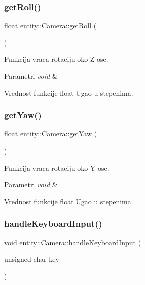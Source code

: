 \subsubsection{\texorpdfstring{get\+Roll()}{getRoll()}}
{\footnotesize\ttfamily float entity\+::\+Camera\+::get\+Roll (\begin{DoxyParamCaption}{ }\end{DoxyParamCaption})}



Funkcija vraca rotaciju oko Z ose. 


\begin{DoxyParams}{Parametri}
{\em void} & \\
\hline
\end{DoxyParams}
\begin{DoxyReturn}{Vrednost funkcije}
float Ugao u stepenima. 
\end{DoxyReturn}
\mbox{\label{classentity_1_1Camera_a598fc170be541c2daf281f3b3a267808}} 
\subsubsection{\texorpdfstring{get\+Yaw()}{getYaw()}}
{\footnotesize\ttfamily float entity\+::\+Camera\+::get\+Yaw (\begin{DoxyParamCaption}{ }\end{DoxyParamCaption})}



Funkcija vraca rotaciju oko Y ose. 


\begin{DoxyParams}{Parametri}
{\em void} & \\
\hline
\end{DoxyParams}
\begin{DoxyReturn}{Vrednost funkcije}
float Ugao u stepenima. 
\end{DoxyReturn}
\mbox{\label{classentity_1_1Camera_a04352a62ec2c4031cfde35192faf6e03}} 
\subsubsection{\texorpdfstring{handle\+Keyboard\+Input()}{handleKeyboardInput()}}
{\footnotesize\ttfamily void entity\+::\+Camera\+::handle\+Keyboard\+Input (\begin{DoxyParamCaption}\item[{unsigned char}]{key }\end{DoxyParamCaption})}



